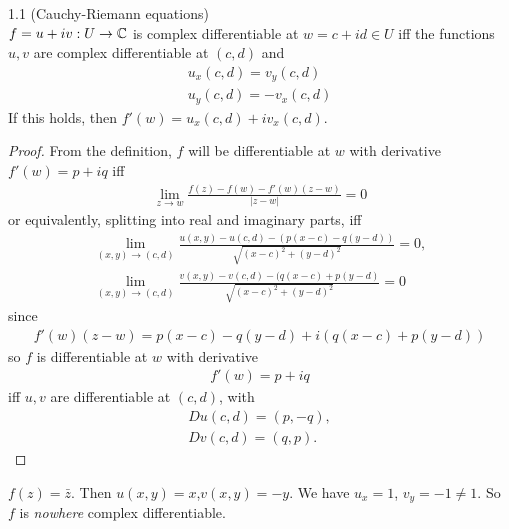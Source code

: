\documentclass[a4paper]{article}
\begin{document}
\begin{thm} 1.1 (Cauchy-Riemann equations)\\
$f=u+iv:U \to \mathbb{C}$ is complex differentiable at $w = c+id \in U$ iff the functions $u,v$ are complex differentiable at $(c,d)$ and
\begin{equation*}
\begin{aligned}
u_x(c,d)=v_y(c,d)\\
u_y(c,d)=-v_x(c,d)
\end{aligned}
\end{equation*}
If this holds, then $f'(w) = u_x(c,d)+iv_x(c,d)$.
\begin{proof}
From the definition, $f$ will be differentiable at $w$ with derivative $f'(w)=p+iq$ iff 
\begin{equation*}
\begin{aligned}
\lim_{z \to w}\frac{f(z)-f(w)-f'(w)(z-w)}{|z-w|} = 0
\end{aligned}
\end{equation*}
or equivalently, splitting into real and imaginary parts, iff
\begin{equation*}
\begin{aligned}
\lim_{(x,y)\to (c,d)} \frac{u(x,y)-u(c,d)-(p(x-c)-q(y-d))}{\sqrt{(x-c)^2+(y-d)^2}} = 0,\\
\lim_{(x,y)\to (c,d)} \frac{v(x,y)-v(c,d)-(q(x-c)+p(y-d)}{\sqrt{(x-c)^2+(y-d)^2}} = 0
\end{aligned}
\end{equation*}
since
\begin{equation*}
\begin{aligned}
f'(w)(z-w) = p(x-c)-q(y-d)+i(q(x-c)+p(y-d))
\end{aligned}
\end{equation*}
so $f$ is differentiable at $w$ with derivative
\begin{equation*}
\begin{aligned}
f'(w)=p+iq
\end{aligned}
\end{equation*}
iff $u,v$ are differentiable at $(c,d)$, with
\begin{equation*}
\begin{aligned}
Du(c,d)=(p,-q),\\
Dv(c,d)=(q,p).
\end{aligned}
\end{equation*}
\end{proof}
\end{thm}

\begin{eg}
$f(z)=\bar{z}$. Then $u(x,y)=x$,$v(x,y)=-y$. We have $u_x=1$, $v_y=-1 \neq 1$. So $f$ is \emph{nowhere} complex differentiable.
\end{eg}
\end{document}
